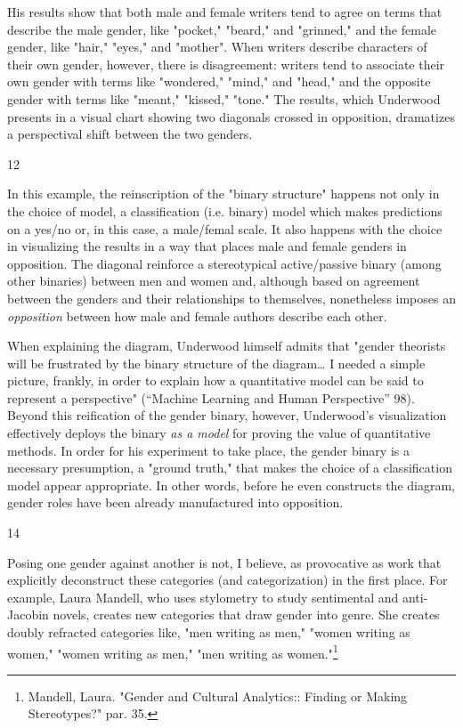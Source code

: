 \documentclass[11pt]{article}
\begin{document}
His results show that both male and female writers tend to agree on
terms that describe the male gender, like "pocket," "beard," and
"grinned," and the female gender, like "hair," "eyes," and "mother".
When writers describe characters of their own gender, however, there
is disagreement: writers tend to associate their own gender with terms
like "wondered," "mind," and "head," and the opposite gender with
terms like "meant," "kissed," "tone." The results, which Underwood
presents in a visual chart showing two diagonals crossed in
opposition, dramatizes a perspectival shift between the two genders.

12

In this example, the reinscription of the "binary structure" happens
not only in the choice of model, a classification (i.e. binary) model
which makes predictions on a yes/no or, in this case, a male/femal
scale. It also happens with the choice in visualizing the results in a
way that places male and female genders in opposition. The diagonal
reinforce a stereotypical active/passive binary (among other binaries)
between men and women and, although based on agreement between the
genders and their relationships to themselves, nonetheless imposes an
\emph{opposition} between how male and female authors describe each other.

When explaining the diagram, Underwood himself admits that "gender
theorists will be frustrated by the binary structure of the diagram\ldots{}
I needed a simple picture, frankly, in order to explain how a
quantitative model can be said to represent a perspective" (“Machine
Learning and Human Perspective” 98). Beyond this reification of the
gender binary, however, Underwood's visualization effectively deploys
the binary \emph{as a model} for proving the value of quantitative methods.
In order for his experiment to take place, the gender binary is a
necessary presumption, a "ground truth," that makes the choice of a
classification model appear appropriate. In other words, before he
even constructs the diagram, gender roles have been already
manufactured into opposition.

14

Posing one gender against another is not, I believe, as provocative as
work that explicitly deconstruct these categories (and categorization)
in the first place. For example, Laura Mandell, who uses stylometry to
study sentimental and anti-Jacobin novels, creates new categories that
draw gender into genre. She creates doubly refracted categories like,
"men writing as men," "women writing as women," "women writing as
men," "men writing as women."\footnote{Mandell, Laura. "Gender and Cultural Analytics:: Finding or
Making Stereotypes?" par. 35.}
\end{document}

